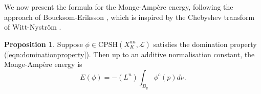 \documentclass[a4paper]{article}
\theoremstyle{definition}
\newtheorem{prop}[thm]{Proposition}
\begin{document}
	
	
	
	
	
	
	We now present the formula for the Monge-Amp\`ere energy, following the approach of Boucksom-Eriksson \cite{Boucksomnew1}, which is inspired by the Chebyshev transform of Witt-Nystr\"om \cite{WittNystrom}.
	
	
	\begin{prop}\label{prop:MAenergy}
	Suppose $\phi\in \text{CPSH}(X_K^{an},\mathcal{L})$ satisfies the domination property (\ref{eqn:dominationproperty}).
		Then up to an additive normalisation constant, the Monge-Amp\`ere energy is
		\begin{equation}
		E(\phi)= -(L^n) \int_{B_y}  \phi^c(p) d\nu.
		\end{equation}
	
	\end{prop}
	
	
	

	
	
\end{document}
